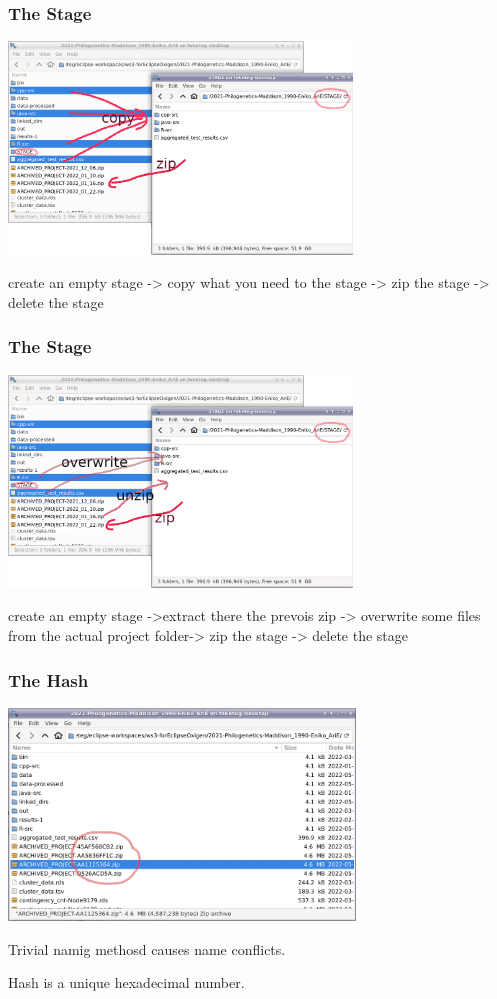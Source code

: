 \documentclass[aspectratio=169]{beamer}
\begin{document}
\begin{frame}
\frametitle<presentation>{The Stage}
\includegraphics[height=160pt]{pictures/project_folder_stageing.png}

  create an empty stage -> copy what you need to the stage -> zip the stage -> delete the stage
\end{frame}

\begin{frame}
\frametitle<presentation>{The Stage}
\includegraphics[height=160pt]{pictures/project_folder_stageing-2.png}

 create an empty stage ->extract there the prevois zip -> overwrite some files from the actual project folder-> zip the stage -> delete the stage
\end{frame}


\begin{frame}
\frametitle<presentation>{The Hash}
\includegraphics[height=160pt]{pictures/project_folder_with_hash_named_zips.png}

Trivial namig methosd causes name conflicts.

Hash is a unique hexadecimal number.
\end{frame}
\end{document}
